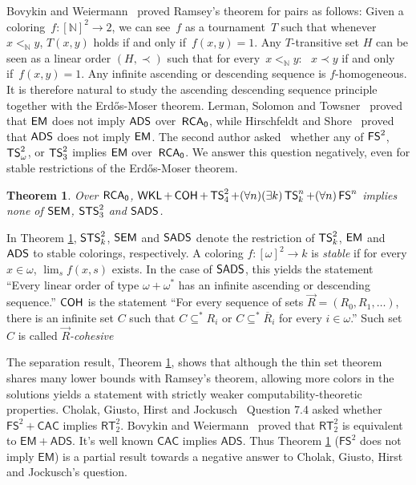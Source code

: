 \documentclass{amsart}
\newtheorem{theorem}{Theorem}[section]
\theoremstyle{definition}
\theoremstyle{remark}
\numberwithin{equation}{section}
\theoremstyle{noparens}
\def\msf{\mathsf}
\def\v{\vec}
\newcommand{\Nb}{\mathbb{N}}
\newcommand{\s}[1]{\ensuremath{\sf{#1}}}
\DeclareMathOperator{\rca}{\s{RCA}_0}
\DeclareMathOperator{\wkl}{\s{WKL}}
\DeclareMathOperator{\ads}{\s{ADS}}
\DeclareMathOperator{\sads}{\s{SADS}}
\DeclareMathOperator{\coh}{\s{COH}}
\DeclareMathOperator{\ts}{\s{TS}}
\DeclareMathOperator{\sts}{\s{STS}}
\DeclareMathOperator{\fs}{\s{FS}}
\DeclareMathOperator{\emo}{\s{EM}}
\DeclareMathOperator{\semo}{\s{SEM}}
\begin{document}
Bovykin and Weiermann~\cite{Bovykin2005strength} proved Ramsey's theorem for pairs as follows:
Given a coloring~$f : [\Nb]^2 \to 2$, we can see~$f$ as a tournament~$T$
such that whenever~$x <_\Nb y$, $T(x,y)$ holds if and only if~$f(x,y) = 1$.
Any $T$-transitive set $H$ can be seen as a linear order $(H, \prec)$
such that for every~$x <_\Nb y$: ~$x \prec y$ if and only if~$f(x,y) = 1$.
Any infinite ascending or descending sequence is $f$-homogeneous.
It is therefore natural to study the ascending descending sequence principle
together with the Erd\H{o}s-Moser theorem.
Lerman, Solomon and Towsner~\cite{Lerman2013Separating} proved that $\emo$ does not imply $\ads$ over~$\rca$,
while Hirschfeldt and Shore~\cite{Hirschfeldt2007Combinatorial} proved that $\ads$ does not imply $\emo$.
The second author asked~\cite{Patey2016weakness} whether any of $\fs^2$, $\ts^2_\omega$, or $\ts^2_3$
implies $\emo$ over~$\rca$. We answer this question negatively, even for
stable restrictions of the Erd\H{o}s-Moser   theorem.

\begin{theorem}\label{thm:many-and-ts24-not-sem-and-many}
Over $\rca$, $\wkl + \coh + \ts^2_4 + (\forall n)(\exists k)\ts^n_k + (\forall n)\fs^n$
implies none of $\semo$, $\sts^2_3$ and $\sads$.
\end{theorem}


In  Theorem \ref{thm:many-and-ts24-not-sem-and-many},
 $\sts^2_k$, $\semo$ and $\sads$ denote the restriction
of $\ts^2_k$, $\emo$ and $\ads$ to stable colorings, respectively.
A coloring $f : [\omega]^2 \to k$ is \emph{stable} if for every $x \in \omega$,
$\lim_s f(x, s)$ exists. In the case of $\sads$, this yields the statement ``Every linear order
of type $\omega+\omega^{*}$ has an infinite ascending or descending sequence.''
$\coh$ is the statement ``For every sequence of sets $\vec R=(R_0, R_1, \dots)$,
there is an infinite set $C$ such that $C \subseteq^{*} R_i$ or $C \subseteq^{*} \overline{R}_i$
for every $i \in \omega$.'' Such set $C$ is called \emph{$\v R$-cohesive}


The separation result, Theorem \ref{thm:many-and-ts24-not-sem-and-many},
  shows that although the thin set theorem
shares many lower bounds with Ramsey's theorem, allowing more colors in the solutions
yields a statement with strictly weaker computability-theoretic properties.
Cholak, Giusto,
Hirst and Jockusch~\cite{Cholak2001Free}
Question 7.4 asked whether $\msf{FS}^2+\msf{CAC}$ implies $\msf{RT}_2^2$.
Bovykin and Weiermann~\cite{Bovykin2005strength} proved
that $\msf{RT}_2^2$ is equivalent to $\msf{EM}+\msf{ADS}$.
It's well known $\msf{CAC}$ implies $\msf{ADS}$.
Thus Theorem \ref{thm:many-and-ts24-not-sem-and-many} ($\msf{FS}^2$ does not imply
$\msf{EM}$) is
a partial result towards a negative answer to Cholak, Giusto,
Hirst and Jockusch's question.
\end{document}
